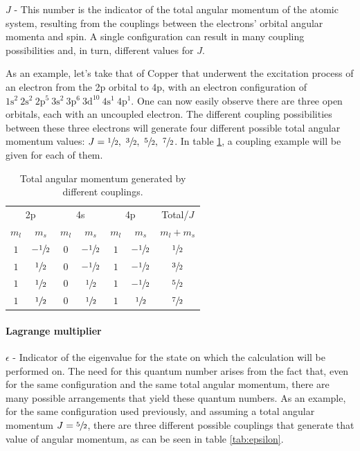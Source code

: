 $J$ - This number is the indicator of the total angular momentum of the atomic system, resulting from the couplings between the electrons'  orbital angular momenta and spin. A single configuration can result in many coupling possibilities and, in turn, different values for $J$.

As an example, let's take that of Copper that underwent the excitation process of an electron from the 2p orbital to 4p, with an electron configuration of $1\text{s}^2\ 2\text{s}^2\ 2\text{p}^5\ 3\text{s}^2\ 3\text{p}^6\ 3\text{d}^{10}\ 4\text{s}^1\  4\text{p}^1 $. One can now easily observe there are three open orbitals, each with an uncoupled electron. The different coupling possibilities between these three electrons will generate four different possible total angular momentum values: $J=\sfrac{1}{2},\ \sfrac{3}{2},\ \sfrac{5}{2},\ \sfrac{7}{2}$. In table \ref{tab:tot_ang_mom}, a coupling example will be given for each of them.


\begin{table}[h!]
    \centering
    \caption{Total angular momentum generated by different couplings.}
    \label{tab:tot_ang_mom}
    \begin{tabular}{cc|cc|cc|c}
        \toprule \multicolumn{2}{c|}{2p}&\multicolumn{2}{c|}{4s}&\multicolumn{2}{c|}{4p}&Total/$J$\\
        $m_l$ & $m_s$ & $m_l$&$m_s$&$m_l$&$m_s$&$m_l+m_s$\\\midrule
        $1$&$-\sfrac{1}{2}$&$0$&$-\sfrac{1}{2}$&$1$&$-\sfrac{1}{2}$&$\sfrac{1}{2}$\\
        $1$&$\sfrac{1}{2}$&$0$&$-\sfrac{1}{2}$&$1$&$-\sfrac{1}{2}$&$\sfrac{3}{2}$\\
        $1$&$\sfrac{1}{2}$&$0$&$\sfrac{1}{2}$&$1$&$-\sfrac{1}{2}$&$\sfrac{5}{2}$\\
        $1$&$\sfrac{1}{2}$&$0$&$\sfrac{1}{2}$&$1$&$\sfrac{1}{2}$&$\sfrac{7}{2}$\\\bottomrule
    \end{tabular}
\end{table}

\paragraph{Lagrange multiplier} $\epsilon$ - Indicator of the eigenvalue for the state on which the calculation will be performed on. The need for this quantum number arises from the fact that, even for the same configuration and the same total angular momentum, there are many possible arrangements that yield these quantum numbers. As an example, for the same configuration used previously, and assuming a total angular momentum $J=\sfrac{5}{2}$, there are three different possible couplings that generate that value of angular momentum, as can be seen in table \ref{tab:epsilon}.


